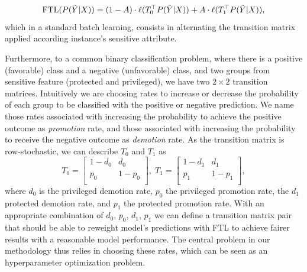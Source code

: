 \begin{equation}
    \operatorname{FTL}(P(\tilde{Y}|X)) = (1-A) \cdot \ell(T^{\top}_0 P(\tilde{Y}|X)) + A \cdot \ell(T^{\top}_1 P(\tilde{Y}|X)),
\end{equation}
which in a standard batch learning, consists in alternating the transition matrix applied according instance's sensitive attribute.

Furthermore, to a common binary classification problem, where there is a positive (favorable) class and a negative (unfavorable) class, and two groups from sensitive feature (protected and privileged), we have two $2\times2$ transition matrices. Intuitively we are choosing rates to increase or decrease the probability of each group to be classified with the positive or negative prediction. We name those rates associated with increasing the probability to achieve the positive outcome as \textit{promotion} rate, and those associated with increasing the probability to receive the negative outcome as \textit{demotion} rate. As the transition matrix is row-stochastic, we can describe $T_0$ and $T_1$ as
\begin{equation} \label{eq:transition_matrices}
    T_0 = \left[\begin{array}{cc}
        1-d_0 & d_0\\
        p_0 & 1-p_0\\
    \end{array}\right],\;
    T_1 = \left[\begin{array}{cc}
        1-d_1 & d_1\\
        p_1 & 1-p_1\\
    \end{array}\right],
\end{equation}
where $d_0$ is the privileged demotion rate, $p_0$ the privileged promotion rate, the $d_1$ protected demotion rate, and $p_1$ the protected promotion rate. With an appropriate combination of $d_0$, $p_0$, $d_1$, $p_1$ we can define a transition matrix pair that should be able to reweight model's predictions with FTL to achieve fairer results with a reasonable model performance. The central problem in our methodology thus relies in choosing these rates, which can be seen as an hyperparameter optimization problem.

